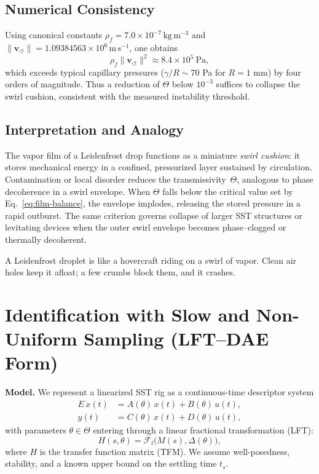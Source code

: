 \documentclass[10pt,reprint,aps,onecolumn,nofootinbib]{revtex4-2}
\begin{document}
    \subsection{Numerical Consistency}

    Using canonical constants
    $\rho_{\!f}=7.0\times10^{-7}\,\mathrm{kg\,m^{-3}}$
    and
    $\lVert\mathbf{v}_{\!\boldsymbol{\circlearrowleft}}\rVert
    =1.09384563\times10^{6}\,\mathrm{m\,s^{-1}}$,
    one obtains
    \[
    \rho_{\!f}\lVert\mathbf{v}_{\!\boldsymbol{\circlearrowleft}}\rVert^{2}
    \approx 8.4\times10^{5}\ \mathrm{Pa},
    \]
    which exceeds typical capillary pressures
    ($\gamma/R\!\sim\!70$ Pa for $R=1$ mm) by four orders of magnitude.
    Thus a reduction of $\Theta$ below $10^{-3}$ suffices to collapse the
    swirl cushion, consistent with the measured instability threshold.

    \subsection{Interpretation and Analogy}

    The vapor film of a Leidenfrost drop functions as a miniature
    \emph{swirl cushion}: it stores mechanical energy in a confined,
    pressurized layer sustained by circulation.
    Contamination or local disorder reduces the transmissivity~$\Theta$,
    analogous to phase decoherence in a swirl envelope.
    When $\Theta$ falls below the critical value set by
    Eq.~\eqref{eq:film-balance}, the envelope implodes,
    releasing the stored pressure in a rapid outburst.
    The same criterion governs collapse of larger SST structures or
    levitating devices when the outer swirl envelope becomes phase--clogged
    or thermally decoherent.

    \begin{tcolorbox}[colframe=gray, title={Physical Analogy}]
    A Leidenfrost droplet is like a hovercraft riding on a swirl of vapor.
    Clean air holes keep it afloat; a few crumbs block them, and it crashes.
    \end{tcolorbox}




\section{Identification with Slow and Non-Uniform Sampling (LFT--DAE Form)}
\label{sec:SST-LFT-ID}
    \textbf{Model.} We represent a linearized SST rig as a continuous-time descriptor system
    \begin{align}
    E\,\dot{x}(t) &= A(\theta)\,x(t)+B(\theta)\,u(t),\\
    y(t) &= C(\theta)\,x(t)+D(\theta)\,u(t),
    \end{align}
    with parameters $\theta\in\Theta$ entering through a linear fractional transformation (LFT):
    \[
    H(s,\theta)=\mathcal{F}_l\!\big(M(s),\Delta(\theta)\big),
    \]
    where $H$ is the transfer function matrix (TFM). We assume well-posedness, stability, and a known upper bound on the settling time $t_s$.
\end{document}
